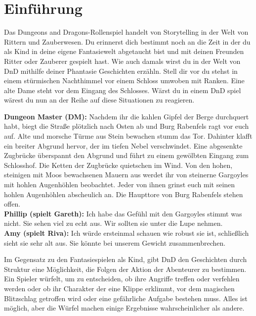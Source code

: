 \chapter{Einführung}
Das Dungeons and Dragons-Rollenspiel handelt von Storytelling in der Welt von Rittern und Zauberwesen. Du erinnerst dich bestimmt noch an die Zeit in der du als Kind in deine eigene Fantasiewelt abgetaucht bist und mit deinen Freunden Ritter oder Zauberer gespielt hast. Wie auch damals wirst du in der Welt von DnD mithilfe deiner Phantasie Geschichten erzähln. Stell dir vor du stehst in einem stürmischen Nachthimmel vor einem Schloss umwoben mit Ranken. Eine alte Dame steht vor dem Eingang des Schlosses. Wärst du in einem DnD spiel wärest du nun an der Reihe auf diese Situationen zu reagieren.

\begin{quotebox}
\textbf{Dungeon Master (DM):}
Nachdem ihr die kahlen Gipfel der Berge durchquert habt, biegt die Straße plötzlich nach Osten ab und Burg Rabenfels ragt vor euch auf. Alte und morsche Türme aus Stein bewachen stumm das Tor. Dahinter klafft ein breiter Abgrund hervor, der im tiefen Nebel verschwindet. Eine abgesenkte Zugbrücke überspannt den Abgrund und führt zu einem gewölbten Eingang zum Schlosshof. Die Ketten der Zugbrücke quietschen im Wind. Von den hohen, steinigen mit Moos bewachsenen Mauern aus werdet ihr von steinerne Gargoyles mit hohlen Augenhöhlen beobachtet. Jeder von ihnen grinst euch mit seinen hohlen Augenhöhlen abscheulich an.  Die Haupttore von Burg Rabenfels stehen offen.\\
\textbf{Phillip (spielt Gareth):} Ich habe das Gefühl mit den Gargoyles stimmt was nicht. Sie sehen viel zu echt aus. Wir sollten sie unter die Lupe nehmen.\\
\textbf{Amy (spielt Riva):} Ich würde ersteinmal schauen wie robust sie ist, schließlich sieht sie sehr alt aus. Sie könnte bei unserem Gewicht zusammenbrechen.
\end{quotebox}

Im Gegensatz zu den Fantasiespielen als Kind, gibt DnD den Geschichten durch Struktur eine Möglichkeit, die Folgen der Aktion der Abenteurer zu bestimmen. Ein Spieler würfelt, um zu entscheiden, ob ihre Angriffe treffen oder verfehlen werden oder ob ihr Charakter der eine Klippe erklimmt, vor dem magischen Blitzschlag getroffen wird oder eine gefährliche Aufgabe bestehen muss. Alles ist möglich, aber die Würfel machen einige Ergebnisse wahrscheinlicher als andere.


